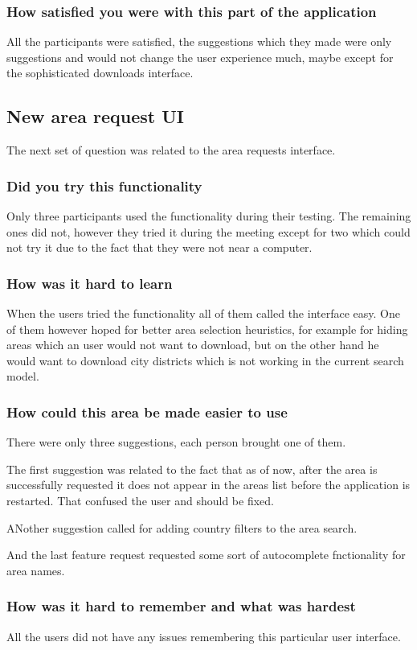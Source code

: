 \documentclass[nolof,digital]{fithesis3}
\begin{document}
\subsubsection{How satisfied you were with this part of the application}
All the participants were satisfied, the suggestions which they made were only suggestions and would not change the user experience much, maybe except for the sophisticated downloads interface.
\subsection{New area request UI}
The next set of question was related to the area requests interface.
\subsubsection{Did you try this functionality}
Only three participants used the functionality during their testing. The remaining ones did not, however they tried it during the meeting except for two which could not try it due to the fact that they were not near a computer.
\subsubsection{How was it hard to learn}
When the users tried the functionality all of them called the interface easy. One of them however hoped for better area selection heuristics, for example for hiding areas which an user would not want to download, but on the other hand he would want to download city districts which is not working in the current search model.
\subsubsection{How could this area be made easier to use}
There were only three suggestions, each person brought one of them.

The first suggestion was related to the fact that as of now, after the area is successfully requested it does not appear in the areas list before the application is restarted. That confused the user and should be fixed.

ANother suggestion called for adding country filters to the area search. 

And the last feature request requested some sort of autocomplete fnctionality for area names.
\subsubsection{How was it hard to remember and what was hardest}
All the users did not have any issues remembering this particular user interface.
\end{document}
